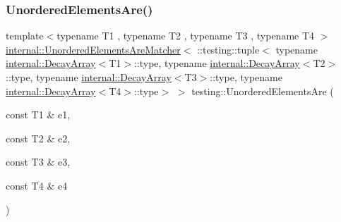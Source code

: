 \mbox{\label{namespacetesting_a8dfb2b88d0cacb8ececc069b0b015991}} 
\subsubsection{\texorpdfstring{Unordered\+Elements\+Are()}{UnorderedElementsAre()}\hspace{0.1cm}{\footnotesize\ttfamily [5/11]}}
{\footnotesize\ttfamily template$<$typename T1 , typename T2 , typename T3 , typename T4 $>$ \\
\hyperlink{classtesting_1_1internal_1_1_unordered_elements_are_matcher}{internal\+::\+Unordered\+Elements\+Are\+Matcher}$<$ \+::testing\+::tuple$<$ typename \hyperlink{structtesting_1_1internal_1_1_decay_array}{internal\+::\+Decay\+Array}$<$T1$>$\+::type, typename \hyperlink{structtesting_1_1internal_1_1_decay_array}{internal\+::\+Decay\+Array}$<$T2$>$\+::type, typename \hyperlink{structtesting_1_1internal_1_1_decay_array}{internal\+::\+Decay\+Array}$<$T3$>$\+::type, typename \hyperlink{structtesting_1_1internal_1_1_decay_array}{internal\+::\+Decay\+Array}$<$T4$>$\+::type$>$ $>$ testing\+::\+Unordered\+Elements\+Are (\begin{DoxyParamCaption}\item[{const T1 \&}]{e1,  }\item[{const T2 \&}]{e2,  }\item[{const T3 \&}]{e3,  }\item[{const T4 \&}]{e4 }\end{DoxyParamCaption})\hspace{0.3cm}{\ttfamily [inline]}}

\mbox{\label{namespacetesting_a5e0ff76eb3f61b6c79b60311ceca73d3}} 
